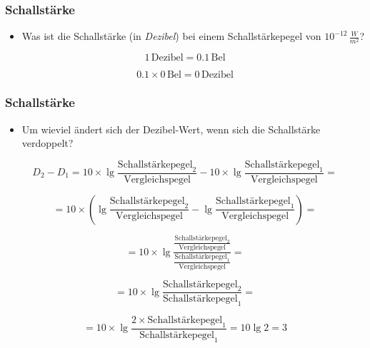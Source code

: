 \documentclass{beamer}
\begin{document}
\begin{frame}
\frametitle{Schallstärke}

\begin{itemize}
\item
Was ist die Schallstärke (in \emph{Dezibel}) bei einem Schallstärkepegel von \(10^{-12}\,\frac{W}{m^2}\)?

\end{itemize}

\[1\,\text{Dezibel} = 0.1\,\text{Bel}\]


\[
0.1 \times 0\,\text{Bel} = 0\,\text{Dezibel}
\]

\end{frame}


\begin{frame}
\frametitle{Schallstärke}


\begin{itemize}
\item
Um wieviel ändert sich der Dezibel-Wert, wenn sich die Schallstärke verdoppelt?
\end{itemize}

\[
D_2 - D_1 = 10\times \lg \frac{\text{Schallstärkepegel}_2}{\text{Vergleichspegel}} - 10\times \lg \frac{\text{Schallstärkepegel}_1}{\text{Vergleichspegel}} =
\]

\pause

\[
= 10 \times \left( \lg \frac{\text{Schallstärkepegel}_2}{\text{Vergleichspegel}} -  \lg \frac{\text{Schallstärkepegel}_1}{\text{Vergleichspegel}} \right)  =
\]

\pause


\[
= 10 \times \lg \frac{\frac{\text{Schallstärkepegel}_2}{\text{Vergleichspegel}}}{\frac{\text{Schallstärkepegel}_1}{\text{Vergleichspegel}}} =
\]

\pause


\[
= 10 \times \lg \frac{\text{Schallstärkepegel}_2}{\text{Schallstärkepegel}_1} =
\]

\pause


\[
= 10 \times \lg  \frac{2\times \text{Schallstärkepegel}_1}{\text{Schallstärkepegel}_1} = 10 \lg 2 = 3
\]


\end{frame}







\begin{frame}
\end{frame}
\end{document}
